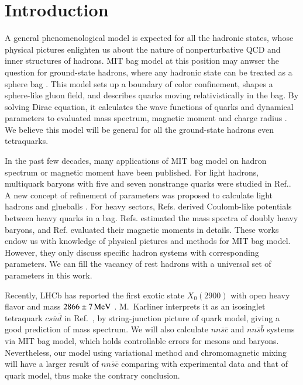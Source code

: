 \documentclass[prd,twocolumn,floatfix,nofootinbib]{revtex4}
\begin{document}
\maketitle\section{Introduction}
A general phenomenological model is expected for all the hadronic states, whose physical pictures enlighten us about the nature of nonperturbative QCD and inner structures of hadrons.
MIT bag model at this position may anwser the question for ground-state hadrons, where any hadronic state can be treated as a sphere bag \cite{Johnson:1975zp}. 
This model sets up a boundary of color confinement, shapes a sphere-like gluon field, and describes quarks moving relativistically in the bag.
By solving Dirac equation, it calculates the wave functions of quarks and dynamical parameters to evaluated mass spectrum, magnetic moment and charge radius \cite{DeGrand:1975cf}.
We believe this model will be general for all the ground-state hadrons even tetraquarks.

In the past few decades, many applications of MIT bag model on hadron spectrum or magnetic moment have been published.
For light hadrons, multiquark baryons with five and seven nonstrange quarks were studied in Ref.\cite{Strottman:1979qu}.
A new concept of refinement of parameters was proposed to calculate light hadrons and glueballs \cite{Carlson:1982er}.
For heavy sectors, Refs.\cite{Haxton:1980mc,Aerts:1980rf} derived Coulomb-like potentials between heavy quarks in a bag.
Refs.\cite{Fleck:1989mb,He:2004px} estimated the mass spectra of doubly heavy baryons, and Ref.\cite{Bernotas:2012nz} evaluated their magnetic moments in details.
These works endow us with knowledge of physical pictures and methods for MIT bag model. However, they only discuss specific hadron systems with corresponding parameters.
We can fill the vacancy of rest hadrons with a universal set of parameters in this work.

Recently, LHCb has reported the first exotic state $X_{0}(2900)$ with open heavy flavor and mass $2866\pm 7\,{\rm MeV}$ \cite{LHCb:2020kd}.
M.~Karliner interprets it as an isosinglet tetraquark $cs\bar{u}\bar{d}$ in Ref.~\cite{Karliner:2020vsi}, by string-junction picture of quark model, giving a good prediction of mass spectrum. 
We will also calculate $nn\bar{s}\bar{c}$ and $nn\bar{s}\bar{b}$ systems via MIT bag model, which holds controllable errors for mesons and baryons.
Nevertheless, our model using variational method and chromomagnetic mixing will have a larger result of $nn\bar{s}\bar{c}$ comparing with experimental data and that of quark model, thus make the contrary conclusion.
\end{document}
